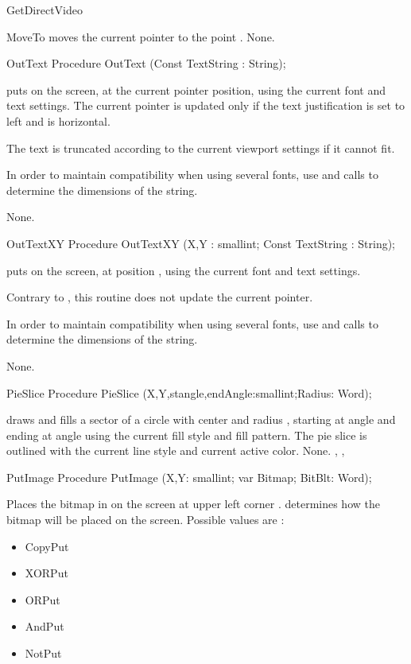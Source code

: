 \begin{function}{GetDirectVideo}
\begin{procedure}{MoveTo}
\Description
{} moves the current pointer to the
point .
\Errors
None.
\SeeAlso
{}
\end{procedure}
\begin{procedure}{OutText}
\Declaration
Procedure OutText (Const TextString : String);

\Description
{} puts  on the screen, at the current pointer
position, using the current font and text settings. The current pointer is
updated only if the text justification is set to left and is horizontal.

The text is truncated according to the current viewport settings if it
cannot fit.

In order to maintain compatibility when using several fonts, use 
and  calls to determine the dimensions of the string.

\Errors
None.
\SeeAlso
{}
\end{procedure}
\begin{procedure}{OutTextXY}
\Declaration
Procedure OutTextXY (X,Y : smallint; Const TextString : String);

\Description
{} puts  on the screen, at position ,
using the current font and text settings.

Contrary to  , this routine does not update the current pointer.

In order to maintain compatibility when using several fonts, use 
and  calls to determine the dimensions of the string.

\Errors
None.
\SeeAlso
{}
\end{procedure}
\begin{procedure}{PieSlice}
\Declaration
Procedure PieSlice (X,Y,stangle,endAngle:smallint;Radius: Word);

\Description
{}
draws and fills a sector of a circle with center  and radius
, starting at angle  and ending at angle 
using the current fill style and fill pattern. The pie slice is outlined
with the current line style and current active color.
\Errors
None.
\SeeAlso
{}, , 
\end{procedure}
\begin{procedure}{PutImage}
\Declaration
Procedure PutImage (X,Y: smallint; var Bitmap; BitBlt: Word);

\Description
{}
Places the bitmap in  on the screen at upper left
corner .  determines how the bitmap
will be placed on the screen. Possible values are :
\begin{itemize}
\item CopyPut
\item XORPut
\item ORPut
\item AndPut
\item NotPut
\end{itemize}


\end{procedure}
\end{function}
